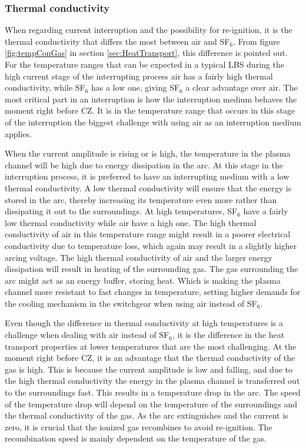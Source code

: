 \documentclass[10pt,a4paper]{article} %
\begin{document}
\subsubsection*{Thermal conductivity}
When regarding current interruption and the possibility for re-ignition, it is the thermal conductivity that differs the most between air and SF$_{6}$. From figure \ref{fig:tempConGas} in section \ref{sec:HeatTransport}, this difference is pointed out. For the temperature ranges that can be expected in a typical LBS during the high current stage of the interrupting process air has a fairly high thermal conductivity, while SF$_6$ has a low one, giving SF$_6$ a clear advantage over air. The most critical part in an interruption is how the interruption medium behaves the moment right before CZ. It is in the temperature range that occurs in this stage of the interruption the biggest challenge with using air as an interruption medium applies.

When the current amplitude is rising or is high, the temperature in the plasma channel will be high due to energy dissipation in the arc. At this stage in the interruption process, it is preferred to have an interrupting medium with a low thermal conductivity. A low thermal conductivity will ensure that the energy is stored in the arc, thereby increasing its temperature even more rather than dissipating it out to the surroundings. At high temperatures, SF$_6$ have a fairly low thermal conductivity while air have a high one. The high thermal conductivity of air in this temperature range might result in a poorer electrical conductivity due to temperature loss, which again may result in a slightly higher arcing voltage. The high thermal conductivity of air and the larger energy dissipation will result in heating of the surrounding gas. The gas surrounding the arc might act as an energy buffer, storing heat. Which is making the plasma channel more resistant to fast changes in temperature, setting higher demands for the cooling mechanism in the switchgear when using air instead of SF$_6$.

Even though the difference in thermal conductivity at high temperatures is a challenge when dealing with air instead of SF$_6$, it is the difference in the heat transport properties at lower temperatures that are the most challenging. At the moment right before CZ, it is an advantage that the thermal conductivity of the gas is high. This is because the current amplitude is low and falling, and due to the high thermal conductivity the energy in the plasma channel is transferred out to the surroundings fast. This results in a temperature drop in the arc. The speed of the temperature drop will depend on the temperature of the surroundings and the thermal conductivity of the gas. As the arc extinguishes and the current is zero, it is crucial that the ionized gas recombines to avoid re-ignition. The recombination speed is mainly dependent on the temperature of the gas. 
\end{document}

